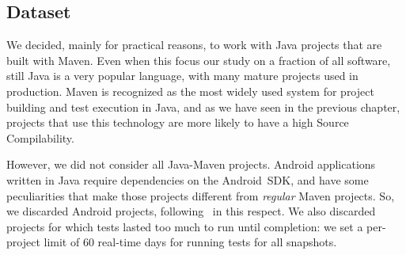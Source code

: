 


\subsection{Dataset}


We decided, mainly for practical reasons, to work with Java projects that are built with Maven. 
Even when this focus our study on a fraction of all software, still Java is a very popular language, with many mature projects used in production. 
Maven is recognized as the most widely used system for project building and test execution in Java, and as we have seen in the previous chapter, projects that use this technology are more likely to have a high Source Compilability.

However, we did not consider all Java-Maven projects. 
Android applications written in Java require dependencies on the Android~SDK, and have some peculiarities that make those projects different from \textit{regular} Maven projects. 
So, we discarded Android projects, following~\cite{Sulir:2016:QSJ:3001878.3001882} in this respect. 
We also discarded projects for which tests lasted too much to run until completion: we set a per-project limit of 60 real-time days for running tests for all snapshots.

